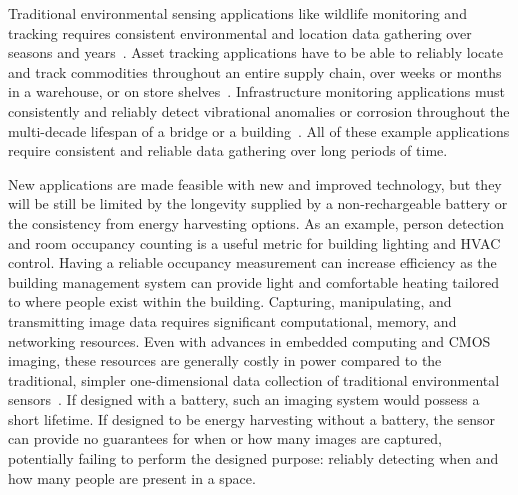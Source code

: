 Traditional environmental sensing applications like wildlife monitoring and tracking requires consistent environmental and location data gathering over seasons and years~\cite{mainwaring2002wireless,juang2002energy}.
Asset tracking applications have to be able to reliably locate and track commodities throughout an entire supply chain, over weeks or months in a warehouse, or on store shelves~\cite{williotpixel}.
Infrastructure monitoring applications must consistently and reliably detect vibrational anomalies or corrosion throughout the multi-decade lifespan of a bridge or a building~\cite{afanasov2020battery,jagtap2021repurposing}.
All of these example applications require consistent and reliable data gathering over long periods of time.

New applications are made feasible with new and improved technology, but they will be still be limited by the longevity supplied by a non-rechargeable battery or the consistency from energy harvesting options.
As an example, person detection and room occupancy counting is a useful metric for building lighting and HVAC control.
Having a reliable occupancy measurement can increase efficiency as the building management system can provide light and comfortable heating tailored to where people exist within the building. 
Capturing, manipulating, and transmitting image data requires significant computational, memory, and networking resources. 
Even with advances in embedded computing and CMOS imaging, these resources are generally costly in power compared to the traditional, simpler one-dimensional data collection of traditional environmental sensors~\cite{mainwaring2002wireless,desai2022camaroptera}. 
If designed with a battery, such an imaging system would possess a short lifetime. If designed to be energy harvesting without a battery, the sensor can provide no guarantees for when or how many images are captured, potentially failing to perform the designed purpose: reliably detecting when and how many people are present in a space. 

